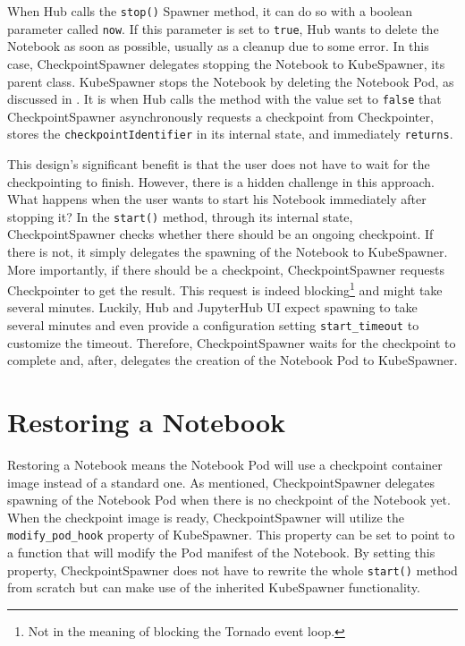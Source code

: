 \documentclass[
  digital,     %
  oneside,     %
  nosansbold,  %
  nocolorbold, %
  lof,         %
  nolot,         %
]{fithesis4}
\begin{document}
When Hub calls the \texttt{stop()} Spawner method, it can do so with a boolean parameter called \texttt{now}. If this parameter is set to \texttt{true}, Hub wants to delete the Notebook as soon as possible, usually as a cleanup due to some error. In this case, CheckpointSpawner delegates stopping the Notebook to KubeSpawner, its parent class.
KubeSpawner stops the Notebook by deleting the Notebook Pod, as discussed in .
It is when Hub calls the method with the value set to \texttt{false} that CheckpointSpawner asynchronously requests a checkpoint from Checkpointer, stores the \texttt{checkpointIdentifier} in its internal state, and immediately \texttt{returns}.

This design's significant benefit is that the user does not have to wait for the checkpointing to finish. However, there is a hidden challenge in this approach. What happens when the user wants to start his Notebook immediately after stopping it? In the \texttt{start()} method, through its internal state, CheckpointSpawner checks whether there should be an ongoing checkpoint. If there is not, it simply delegates the spawning of the Notebook to KubeSpawner. More importantly, if there should be a checkpoint, CheckpointSpawner requests Checkpointer to get the result. This request is indeed blocking\footnote{Not in the meaning of blocking the Tornado event loop.} and might take several minutes. Luckily, Hub and JupyterHub UI expect spawning to take several minutes and even provide a configuration setting \texttt{start\_timeout} to customize the timeout. Therefore, CheckpointSpawner waits for the checkpoint to complete and, after, delegates the creation of the Notebook Pod to KubeSpawner.

\section{Restoring a Notebook}
Restoring a Notebook means the Notebook Pod will use a checkpoint container image instead of a standard one. As mentioned, CheckpointSpawner delegates spawning of the Notebook Pod when there is no checkpoint of the Notebook yet. When the checkpoint image is ready, CheckpointSpawner will utilize the \texttt{modify\_pod\_hook} property of KubeSpawner. This property can be set to point to a function that will modify the Pod manifest of the Notebook. By setting this property, CheckpointSpawner does not have to rewrite the whole \texttt{start()} method from scratch but can make use of the inherited KubeSpawner functionality.
\end{document}
